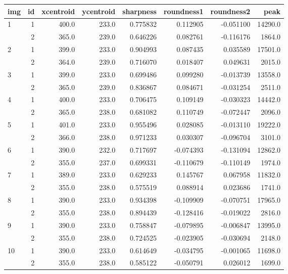 \begin{tabular*}{.9\linewidth}{@{\extracolsep{\fill}}lrrrrrrr}
		\hline
		img & id & xcentroid & ycentroid & sharpness & roundness1 & roundness2 &    peak \\ \hline\hline
		1   &  1 &     400.0 &     233.0 &  0.775832 &   0.112905 &  -0.051100 & 14290.0 \\
		    &  2 &     365.0 &     239.0 &  0.646226 &   0.082761 &  -0.116176 &  1864.0 \\ \hline
		2   &  1 &     399.0 &     233.0 &  0.904993 &   0.087435 &   0.035589 & 17501.0 \\
		    &  2 &     364.0 &     239.0 &  0.716070 &   0.018407 &   0.049631 &  2015.0 \\ \hline
		3   &  1 &     399.0 &     233.0 &  0.699486 &   0.099280 &  -0.013739 & 13558.0 \\
		    &  2 &     365.0 &     239.0 &  0.836867 &   0.084671 &  -0.031254 &  2511.0 \\ \hline
		4   &  1 &     400.0 &     233.0 &  0.706475 &   0.109149 &  -0.030323 & 14442.0 \\
		    &  2 &     365.0 &     238.0 &  0.681082 &   0.110749 &  -0.072447 &  2096.0 \\  \hline
		5   &  1 &     401.0 &     233.0 &  0.955496 &   0.028085 &  -0.013110 & 19222.0 \\
		    &  2 &     366.0 &     238.0 &  0.971233 &   0.030307 &  -0.096704 &  3101.0 \\ \hline
		6   &  1 &     390.0 &     232.0 &  0.717697 &  -0.074393 &  -0.131094 & 12862.0 \\
		    &  2 &     355.0 &     237.0 &  0.699331 &  -0.110679 &  -0.110149 &  1974.0 \\ \hline
		7   &  1 &     389.0 &     233.0 &  0.629233 &   0.145767 &   0.067958 & 11832.0 \\
		    &  2 &     355.0 &     238.0 &  0.575519 &   0.088914 &   0.023686 &  1741.0 \\ \hline
		8   &  1 &     390.0 &     233.0 &  0.934398 &  -0.109909 &  -0.070751 & 17965.0 \\
		    &  2 &     355.0 &     238.0 &  0.894439 &  -0.128416 &  -0.019022 &  2816.0 \\ \hline
		9   &  1 &     390.0 &     233.0 &  0.758847 &  -0.079895 &  -0.006847 & 13995.0 \\
		    &  2 &     355.0 &     238.0 &  0.724525 &  -0.023905 &  -0.030694 &  2148.0 \\ \hline
		10  &  1 &     390.0 &     233.0 &  0.614649 &  -0.034795 &  -0.001065 & 11698.0 \\
		    &  2 &     355.0 &     238.0 &  0.585122 &  -0.050791 &   0.026012 &  1699.0 \\ \hline
\end{tabular*}